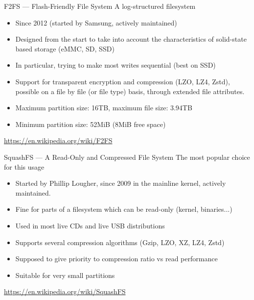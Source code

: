 \begin{frame}{F2FS --- Flash-Friendly File System}
    A log-structured filesystem
    \begin{itemize}
        \item Since 2012 (started by Samsung, actively maintained)
        \item Designed from the start to take into account the
              characteristics of solid-state based storage (eMMC, SD, SSD)
        \item In particular, trying to make most writes sequential (best on SSD)
        \item Support for transparent encryption and compression (LZO,
              LZ4, Zstd), possible on a file by file (or file type)
              basis, through extended file attributes.
        \item Maximum partition size: 16TB, maximum file size: 3.94TB
        \item Minimum partition size: 52MiB (8MiB free space)
    \end{itemize}
    \url{https://en.wikipedia.org/wiki/F2FS}
\end{frame}

\begin{frame}{SquashFS --- A Read-Only and Compressed File System}
    The most popular choice for this usage
    \begin{itemize}
        \item Started by Phillip Lougher, since 2009 in the mainline kernel, actively maintained.
        \item Fine for parts of a filesystem which can be read-only (kernel, binaries...)
        \item Used in most live CDs and live USB distributions
        \item Supports several compression algorithms (Gzip, LZO, XZ, LZ4, Zstd)
        \item Supposed to give priority to compression ratio vs read performance
        \item Suitable for very small partitions
    \end{itemize}
    \url{https://en.wikipedia.org/wiki/SquashFS}
\end{frame}

